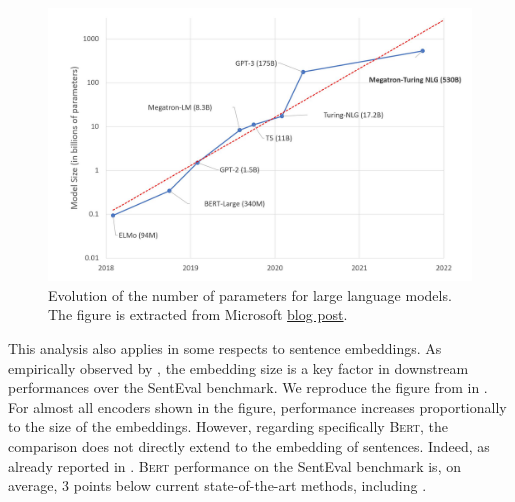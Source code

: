 

\begin{figure}[htb!]
	\includegraphics[width=\textwidth]{images/model-size-graph.jpeg}
	\caption[Large models number of parameters]{Evolution of the number of parameters for large language models. The figure is extracted from Microsoft \href{https://www.microsoft.com/en-us/research/blog/using-deepspeed-and-megatron-to-train-megatron-turing-nlg-530b-the-worlds-largest-and-most-powerful-generative-language-model/}{blog post}.}
\end{figure}

This analysis also applies in some respects to sentence embeddings. As empirically observed by \textcite{conneau_17}, the embedding size is a key factor in downstream performances over the SentEval benchmark. We reproduce the figure from \textcite{conneau_17} in . For almost all encoders shown in the figure, performance increases proportionally to the size of the embeddings. However, regarding specifically \textsc{Bert}, the comparison does not directly extend to the embedding of sentences. Indeed, as already reported in . \textsc{Bert} performance on the SentEval benchmark is, on average, 3 points below current state-of-the-art methods, including \textcite{simoulin_2021a}.

